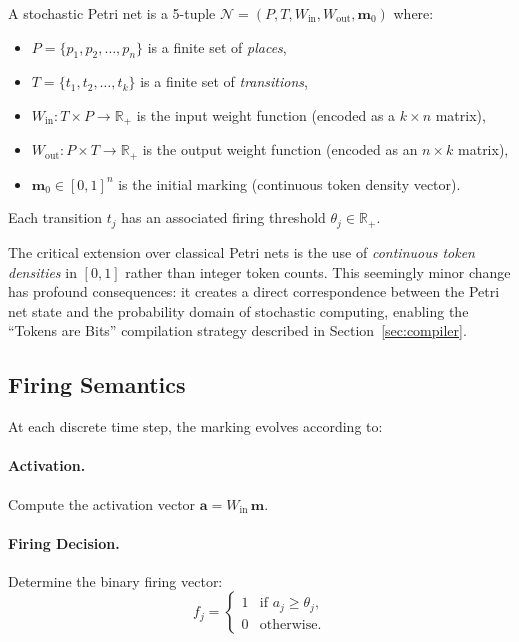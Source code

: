\documentclass[12pt]{article}
\begin{document}
A stochastic Petri net is a 5-tuple
$\mathcal{N} = (P, T, W_{\mathrm{in}}, W_{\mathrm{out}}, \mathbf{m}_0)$
where:
\begin{itemize}
  \item $P = \{p_1, p_2, \ldots, p_n\}$ is a finite set of \emph{places},
  \item $T = \{t_1, t_2, \ldots, t_k\}$ is a finite set of
    \emph{transitions},
  \item $W_{\mathrm{in}} : T \times P \to \mathbb{R}_+$ is the input
    weight function (encoded as a $k \times n$ matrix),
  \item $W_{\mathrm{out}} : P \times T \to \mathbb{R}_+$ is the output
    weight function (encoded as an $n \times k$ matrix),
  \item $\mathbf{m}_0 \in [0, 1]^n$ is the initial marking (continuous
    token density vector).
\end{itemize}
Each transition $t_j$ has an associated firing threshold
$\theta_j \in \mathbb{R}_+$.

The critical extension over classical Petri nets is the use of
\emph{continuous token densities} in $[0,1]$ rather than integer token
counts.  This seemingly minor change has profound consequences: it
creates a direct correspondence between the Petri net state and the
probability domain of stochastic computing, enabling the ``Tokens are
Bits'' compilation strategy described in Section~\ref{sec:compiler}.

\subsection{Firing Semantics}

At each discrete time step, the marking evolves according to:

\paragraph{Activation.} Compute the activation vector
$\mathbf{a} = W_{\mathrm{in}} \, \mathbf{m}$.

\paragraph{Firing Decision.} Determine the binary firing vector:
\begin{equation}
  f_j = \begin{cases}
    1 & \text{if } a_j \ge \theta_j, \\
    0 & \text{otherwise}.
  \end{cases}
  \label{eq:binary-firing}
\end{equation}
\end{document}
